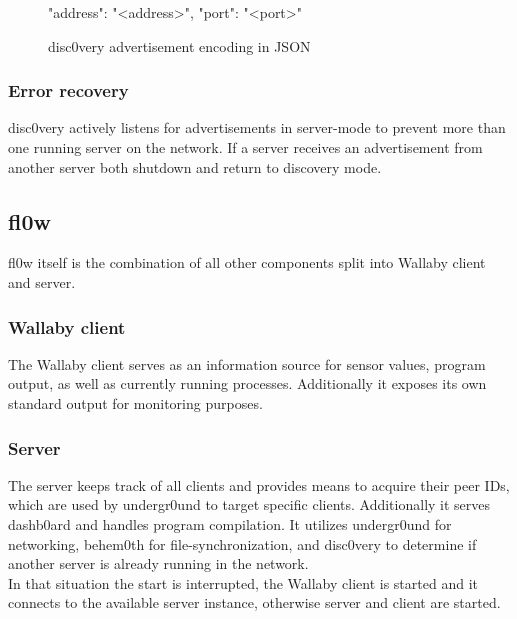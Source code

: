 \documentclass[conference]{IEEEtran}
\begin{document}
\begin{figure}[H]
\centering
\begin{json}
{
    "address": "<address>",
    "port": "<port>"
}
\end{json}
\caption{disc0very advertisement encoding in JSON\cite{JSON:T. Bray Ed.}}
\label{fig:discovery_advertisement}
\end{figure}

\subsubsection{Error recovery}
disc0very\cite{disc0very:Christoph Heiss} actively listens for advertisements in server-mode to prevent more than one running server on the network. If a server receives an advertisement from another server both shutdown and return to discovery mode.


\subsection{fl0w}
fl0w\cite{fl0w:Philip Trauner} itself is the combination of all other components split into Wallaby\cite{Wallaby Controller:KIPR} client and server.\\

\subsubsection{Wallaby client}
The Wallaby\cite{Wallaby Controller:KIPR} client serves as an information source for sensor values, program output, as well as currently running processes. Additionally it exposes its own standard output for monitoring purposes.\\

\subsubsection{Server}
The server keeps track of all clients and provides means to acquire their peer IDs, which are used by undergr0und to target specific clients. Additionally it serves dashb0ard\cite{dashb0ard:Sebastian Schaffler} and handles program compilation. It utilizes undergr0und for networking, behem0th for file-synchronization, and disc0very to determine if another server is already running in the network. \\
In that situation the start is interrupted, the Wallaby\cite{Wallaby Controller:KIPR} client is started and it connects to the available server instance, otherwise server and client are started. \\
\end{document}
